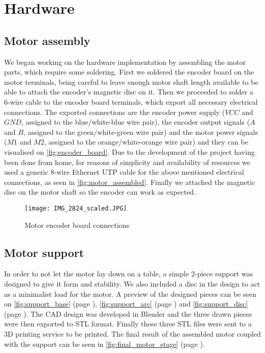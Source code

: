 \section{Hardware} \label{sec:hardware-devel}

\subsection{Motor assembly}
We began working on the hardware implementation by assembling the motor parts, which require some soldering.
First we soldered the encoder board on the motor terminals, being careful to leave enough motor shaft length available to be able to attach the encoder's magnetic disc on it.
Then we proceeded to solder a 6-wire cable to the encoder board terminals, which export all necessary electrical connections.
The exported connections are the encoder power supply ($VCC$ and $GND$, assigned to the blue/white-blue wire pair), the encoder output signals ($A$ and $B$, assigned to the green/white-green wire pair) and the motor power signals ($M1$ and $M2$, assigned to the orange/white-orange wire pair) and they can be visualised on \autoref{fig:encoder_board}.
Due to the development of the project having been done from home, for reasons of simplicity and availability of resources we used a generic 8-wire Ethernet UTP cable for the above mentioned electrical connections, as seen in \autoref{fig:motor_assembled}.
Finally we attached the magnetic disc on the motor shaft so the encoder can work as expected.

\begin{figure}[htp]
	\centering
	\texttt{[image: IMG\_2824\_scaled.JPG]}
	\caption{Motor encoder board connections}
	\label{fig:encoder_board}
\end{figure}

\subsection{Motor support}
In order to not let the motor lay down on a table, a simple 2-piece support was designed to give it form and stability.
We also included a disc in the design to act as a minimalist load for the motor.
A preview of the designed pieces can be seen on \autoref{fig:support_base} (page \pageref{fig:support_base}), \autoref{fig:support_arc} (page \pageref{fig:support_arc}) and \autoref{fig:support_disc} (page \pageref{fig:support_disc}).
The CAD design was developed in Blender \cite{sw:blender} and the three drawn pieces were then exported to STL format.
Finally these three STL files were sent to a 3D printing service to be printed.
The final result of the assembled motor coupled with the support can be seen in \autoref{fig:final_motor_stage} (page \pageref{fig:final_motor_stage}).

